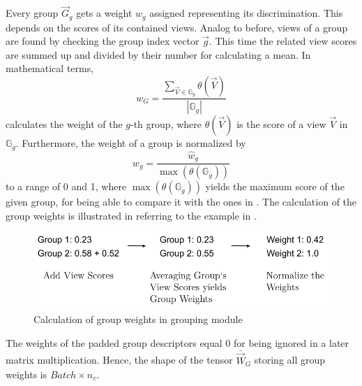 Every group $\vec{G}_g$ gets a weight $w_g$ assigned representing its discrimination.
This depends on the scores of its contained views.
Analog to before, views of a group are found by checking the group index vector $\vec{g}$.
This time the related view scores are summed up and divided by their number for calculating a mean.
In mathematical terms,
\begin{equation}
	{w}_G = \frac{\sum_{\vec{V} \in \mathbb{G}_g} \theta(\vec{V})}{|\mathbb{G}_g|}
\end{equation}
calculates the weight of the $g$-th group, where $\theta(\vec{V})$ is the score of a view $\vec{V}$ in $\mathbb{G}_g$.
Furthermore, the weight of a group is normalized by
\begin{equation}
	w_g = \frac{\hat{w}_g}{\max(\theta(\mathbb{G}_g))}
\end{equation}
to a range of 0 and 1, where $\max(\theta(\mathbb{G}_g))$ yields the maximum score of the given group, for being able to compare it with the ones in \cite{Feng2018}.
The calculation of the group weights is illustrated in  referring to the example in .
\begin{figure}
	\centering
	\includegraphics[]{images/grouping_module_weights.pdf}
	\caption{Calculation of group weights in grouping module}
	\label{fig:grouping-module-weights}
\end{figure}
The weights of the padded group descriptors equal 0 for being ignored in a later matrix multiplication.
Hence, the shape of the tensor $\bar{\vec{W}}_G$ storing all group weights is $Batch \times n_v$.